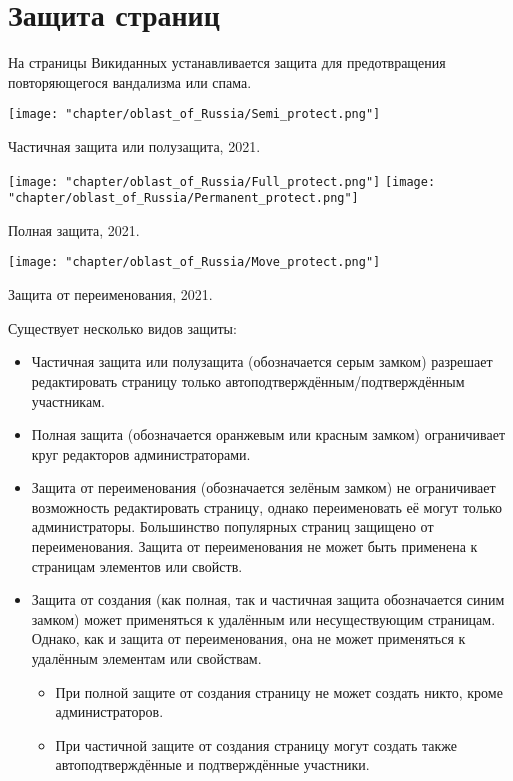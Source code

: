 \section{Защита страниц}

На страницы Викиданных устанавливается защита для предотвращения повторяющегося вандализма или спама. 

\begin{marginfigure}[5.0cm]
{
	\setlength{\fboxsep}{0pt}%
	\setlength{\fboxrule}{1pt}%
	{\texttt{[image: "chapter/oblast\_of\_Russia/Semi\_protect.png"]}}
}
\caption []{Частичная защита или полузащита, 2021.}%
\label{fig:legend_population}%
\end{marginfigure}

\begin{marginfigure}[0.0cm]
{
	\setlength{\fboxsep}{0pt}%
	\setlength{\fboxrule}{1pt}%
	{\texttt{[image: "chapter/oblast\_of\_Russia/Full\_protect.png"]}}
	{\texttt{[image: "chapter/oblast\_of\_Russia/Permanent\_protect.png"]}}
}
\caption []{Полная защита, 2021.}%
\label{fig:legend_population}%
\end{marginfigure}

\begin{marginfigure}[0.0cm]
{
	\setlength{\fboxsep}{0pt}%
	\setlength{\fboxrule}{1pt}%
	{\texttt{[image: "chapter/oblast\_of\_Russia/Move\_protect.png"]}}
}
\caption []{Защита от переименования, 2021.}%
\label{fig:legend_population}%
\end{marginfigure}

Существует несколько видов защиты:
\begin{itemize}
  \item Частичная защита или полузащита (обозначается серым замком) разрешает редактировать страницу только автоподтверждённым/подтверждённым участникам.
  \item Полная защита (обозначается оранжевым или красным замком) ограничивает круг редакторов администраторами.
  \item Защита от переименования (обозначается зелёным замком) не ограничивает возможность редактировать страницу, однако переименовать её могут только администраторы. Большинство популярных страниц защищено от переименования. Защита от переименования не может быть применена к страницам элементов или свойств.
  \item Защита от создания (как полная, так и частичная защита обозначается синим замком) может применяться к удалённым или несуществующим страницам. Однако, как и защита от переименования, она не может применяться к удалённым элементам или свойствам.
  \begin{itemize}
	\item При полной защите от создания страницу не может создать никто, кроме администраторов.
	\item При частичной защите от создания страницу могут создать также автоподтверждённые и подтверждённые участники.
  \end{itemize}
\end{itemize}


